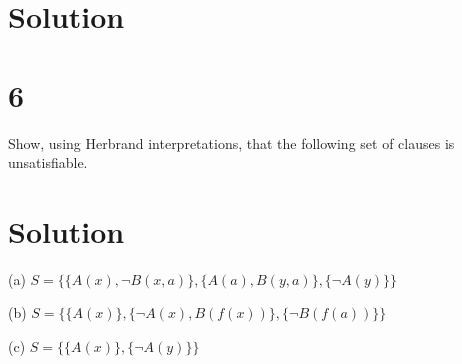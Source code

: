 \documentclass[10pt]{article}
\begin{document}
\section*{Solution}


\section*{6}
Show, using Herbrand interpretations, that the following set of clauses is unsatisfiable.

\section*{Solution} 
\begin{description*}
\item[(a)] $S = \{ \{ A(x), \lnot B(x,a) \}, \{ A(a), B(y,a) \}, \{ \lnot A(y) \} \}$
\item[(b)] $S = \{ \{ A(x)\}, \{ \lnot A(x), B(f(x)) \}, \{ \lnot B(f(a)) \} \}$
\item[(c)] $S = \{ \{ A(x) \}, \{ \lnot A(y) \} \}$
\end{description*}
\end{document}
